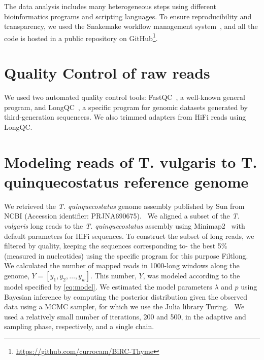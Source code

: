 The data analysis includes many heterogeneous steps using different bioinformatics programs and scripting languages. To ensure reproducibility and transparency, we used the Snakemake workflow management system~\cite{molderSustainableDataAnalysis2021}, and all the code is hosted in a public repository on GitHub\footnote{ \url{https://github.com/currocam/BiRC-Thyme}}.

\section*{Quality Control of raw reads}


We used two automated quality control tools: FastQC~\cite{BabrahamBioinformaticsFastQC}, a well-known general program, and LongQC~\cite{fukasawaLongQCQualityControl2020}, a specific program for genomic datasets generated by third-generation sequencers. We also trimmed adapters from \ac{HiFi} reads using LongQC. ~\cite{fukasawaLongQCQualityControl2020}

\section*{Modeling reads of T. vulgaris to T. quinquecostatus reference genome}

We retrieved the \textit{T. quinquecostatus} genome assembly published by Sun \etal from NCBI (Accession identifier: PRJNA690675).~\cite{sunChromosomelevelAssemblyAnalysis2022} We aligned a subset of the \textit{T. vulgaris} long reads to the \textit{T. quinquecostatus} assembly using Minimap2~\cite{liMinimap2PairwiseAlignment2018} with default parameters for \ac{HiFi} sequences. To construct the subset of long reads, we filtered by quality, keeping the sequences corresponding to- the best 5\% (measured in nucleotides) using the specific program for this purpose Filtlong.~\cite{wickRrwickFiltlong2023}\\



We calculated the number of mapped reads in 1000-long windows along the genome, $Y = [ y_1, y_2, \dots, y_w]$. This number, $Y$, was modeled according to the model specified by \eqref{eq:model}. We estimated the model parameters $\lambda$ and $p$ using Bayesian inference by computing the posterior distribution given the observed data using a \ac{MCMC} sampler, for which we use the Julia library Turing.~\cite{DBLP:conf/aistats/GeXG18} We used a relatively small number of iterations, 200 and 500, in the adaptive and sampling phase, respectively, and a single chain. \\

